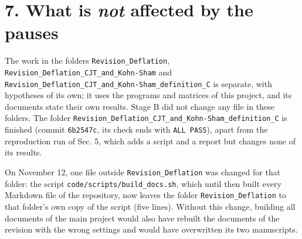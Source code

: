 \documentclass[
  10pt,
]{article}
\begin{document}
\hypertarget{what-is-not-affected-by-the-pauses}{%
\section{\texorpdfstring{7. What is \emph{not} affected by the
pauses}{7. What is not affected by the pauses}}\label{what-is-not-affected-by-the-pauses}}

The work in the folders \texttt{Revision\_Deflation},
\texttt{Revision\_Deflation\_CJT\_and\_Kohn-Sham} and
\texttt{Revision\_Deflation\_CJT\_and\_Kohn-Sham\_definition\_C} is
separate, with hypotheses of its own; it uses the programs and matrices
of this project, and its documents state their own results. Stage B did
not change any file in these folders. The folder
\texttt{Revision\_Deflation\_CJT\_and\_Kohn-Sham\_definition\_C} is
finished (commit \texttt{6b2547c}, its check ends with
\texttt{ALL\ PASS}), apart from the reproduction run of Sec. 5, which
adds a script and a report but changes none of its results.

On November 12, one file outside \texttt{Revision\_Deflation} was
changed for that folder: the script
\texttt{code/scripts/build\_docs.sh}, which until then built every
Markdown file of the repository, now leaves the folder
\texttt{Revision\_Deflation} to that folder's own copy of the script
(five lines). Without this change, building all documents of the main
project would also have rebuilt the documents of the revision with the
wrong settings and would have overwritten its two manuscripts.
\end{document}
